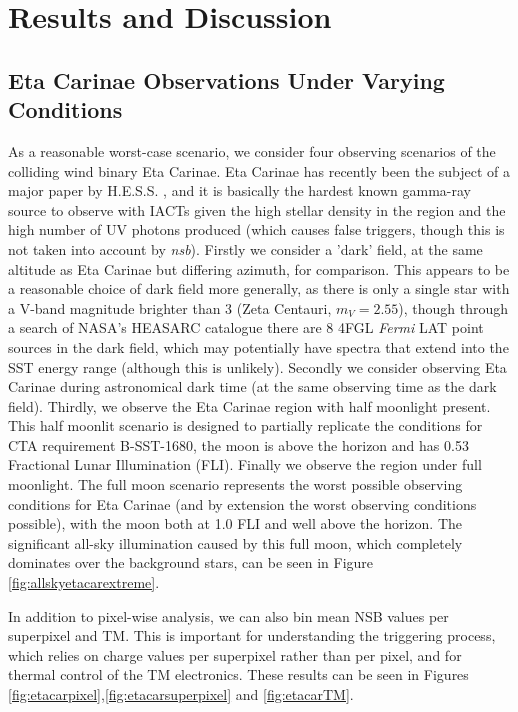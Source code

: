 \section{Results and Discussion}
\subsection{Eta Carinae Observations Under Varying Conditions}
\label{sec:etacarvary}
As a reasonable worst-case scenario, we consider four observing scenarios of the colliding wind binary Eta Carinae. Eta Carinae has recently been the subject of a major paper by H.E.S.S. \cite{hessetacar}, and it is basically the hardest known gamma-ray source to observe with IACTs given the high stellar density in the region and the high number of UV photons produced (which causes false triggers, though this is not taken into account by \textit{nsb}). Firstly we consider a 'dark' field, at the same altitude as Eta Carinae but differing azimuth, for comparison. This appears to be a reasonable choice of dark field more generally, as there is only a single star with a V-band magnitude brighter than 3 (Zeta Centauri, $m_V=2.55$), though through a search of NASA's HEASARC catalogue there are 8 4FGL \textit{Fermi} LAT point sources in the dark field, which may potentially have spectra that extend into the SST energy range (although this is unlikely).  Secondly we consider observing Eta Carinae during astronomical dark time (at the same observing time as the dark field). Thirdly, we observe the Eta Carinae region with half moonlight present. This half moonlit scenario is designed to partially replicate the conditions for CTA requirement B-SST-1680, the moon is above the horizon and has 0.53 Fractional Lunar Illumination (FLI). Finally we observe the region under full moonlight. The full moon scenario represents the worst possible observing conditions for Eta Carinae (and by extension the worst observing conditions possible), with the moon both at 1.0 FLI and well above the horizon. The significant all-sky illumination caused by this full moon, which completely dominates over the background stars, can be seen in Figure \ref{fig:allskyetacarextreme}.

In addition to pixel-wise analysis, we can also bin mean NSB values per superpixel and TM. This is important for understanding the triggering process, which relies on charge values per superpixel rather than per pixel, and for thermal control of the TM electronics. These results can be seen in Figures \ref{fig:etacarpixel},\ref{fig:etacarsuperpixel} and \ref{fig:etacarTM}.


